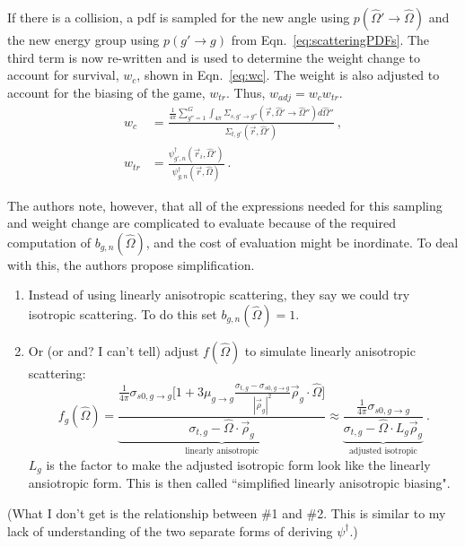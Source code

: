 \documentclass[12pt,twoside]{article}
\newcommand{\vOmega}{\ensuremath{\hat{\Omega}}}
\begin{document}
If there is a collision, a pdf is sampled for the new angle using $p(\vOmega' \rightarrow \vOmega)$ and the new energy group using $p(g' \rightarrow g)$ from Eqn.~\eqref{eq:scatteringPDFs}. The third term is now re-written and is used to determine the weight change to account for survival, $w_c$, shown in Eqn.~\eqref{eq:wc}. The weight is also adjusted to account for the biasing of the game, $w_{tr}$. Thus, $w_{adj} = w_c w_{tr}$. 
\begin{align}
  w_c &= \frac{\frac{1}{4 \pi}\sum_{g''=1}^{G} \int_{4 \pi} \Sigma_{s, g' \rightarrow g''}(\vec{r}, \vOmega' \rightarrow \vOmega'') d\vOmega''}{\Sigma_{t,g'}(\vec{r}, \vOmega')} \:, \label{eq:wc}\\
  w_{tr} &= \frac{\psi^{\dagger}_{g',n}(\vec{r}_i, \vOmega')}{\psi^{\dagger}_{g,n}(\vec{r}, \vOmega)} \:.
\end{align}

The authors note, however, that all of the expressions needed for this sampling and weight change are complicated to evaluate because of the required computation of $b_{g,n}(\vOmega)$, and the cost of evaluation might be inordinate. To deal with this, the authors propose simplification. 
\begin{enumerate}
  \item Instead of using linearly anisotropic scattering, they say we could try isotropic scattering. To do this set $b_{g,n}(\vOmega) = 1$. 
  \item Or (or and? I can't tell) adjust $f(\vOmega)$ to simulate linearly anisotropic scattering:
  \begin{equation}
  f_g(\vOmega) = \underbrace{\frac{\frac{1}{4 \pi}\sigma_{s0, g \rightarrow g} \biggl[1 + 3 \mu_{g \rightarrow g} \frac{\sigma_{t,g} - \sigma_{s0,g \rightarrow g}}{|\vec{\rho}_{g}|^2} \vec{\rho}_{g} \cdot \vOmega \biggr]}{\sigma_{t,g} - \vOmega \cdot \vec{\rho}_{g}}}_{\text{linearly anisotropic}}
   \approx \underbrace{\frac{\frac{1}{4 \pi}\sigma_{s0, g \rightarrow g}}{\sigma_{t,g} - \vOmega \cdot L_g\vec{\rho}_{g}}}_{\text{adjusted isotropic}} \:.
  \end{equation}
  $L_g$ is the factor to make the adjusted isotropic form look like the linearly ansiotropic form. This is then called ``simplified linearly anisotropic biasing".
\end{enumerate}
(What I don't get is the relationship between \#1 and \#2. This is similar to my lack of understanding of the two separate forms of deriving $\psi^{\dagger}$.)
\end{document}
